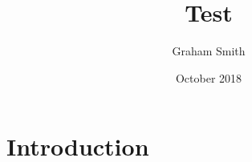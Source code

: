 \documentclass{article}
\title{Test}
\author{Graham Smith}
\date{October 2018}
\begin{document}
\maketitle

\section{Introduction}
\end{document}
